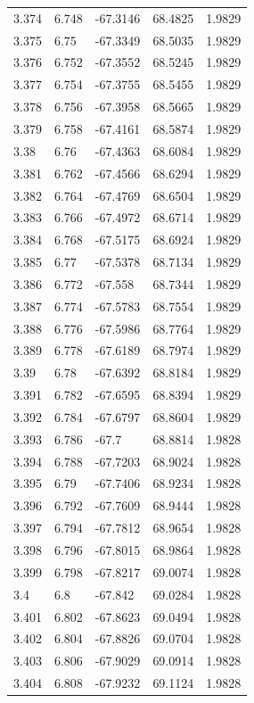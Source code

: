 \begin{tabular}{lllll}
3.374 & 6.748 & -67.3146 & 68.4825 & 1.9829 \\
3.375 & 6.75 & -67.3349 & 68.5035 & 1.9829 \\
3.376 & 6.752 & -67.3552 & 68.5245 & 1.9829 \\
3.377 & 6.754 & -67.3755 & 68.5455 & 1.9829 \\
3.378 & 6.756 & -67.3958 & 68.5665 & 1.9829 \\
3.379 & 6.758 & -67.4161 & 68.5874 & 1.9829 \\
3.38 & 6.76 & -67.4363 & 68.6084 & 1.9829 \\
3.381 & 6.762 & -67.4566 & 68.6294 & 1.9829 \\
3.382 & 6.764 & -67.4769 & 68.6504 & 1.9829 \\
3.383 & 6.766 & -67.4972 & 68.6714 & 1.9829 \\
3.384 & 6.768 & -67.5175 & 68.6924 & 1.9829 \\
3.385 & 6.77 & -67.5378 & 68.7134 & 1.9829 \\
3.386 & 6.772 & -67.558 & 68.7344 & 1.9829 \\
3.387 & 6.774 & -67.5783 & 68.7554 & 1.9829 \\
3.388 & 6.776 & -67.5986 & 68.7764 & 1.9829 \\
3.389 & 6.778 & -67.6189 & 68.7974 & 1.9829 \\
3.39 & 6.78 & -67.6392 & 68.8184 & 1.9829 \\
3.391 & 6.782 & -67.6595 & 68.8394 & 1.9829 \\
3.392 & 6.784 & -67.6797 & 68.8604 & 1.9829 \\
3.393 & 6.786 & -67.7 & 68.8814 & 1.9828 \\
3.394 & 6.788 & -67.7203 & 68.9024 & 1.9828 \\
3.395 & 6.79 & -67.7406 & 68.9234 & 1.9828 \\
3.396 & 6.792 & -67.7609 & 68.9444 & 1.9828 \\
3.397 & 6.794 & -67.7812 & 68.9654 & 1.9828 \\
3.398 & 6.796 & -67.8015 & 68.9864 & 1.9828 \\
3.399 & 6.798 & -67.8217 & 69.0074 & 1.9828 \\
3.4 & 6.8 & -67.842 & 69.0284 & 1.9828 \\
3.401 & 6.802 & -67.8623 & 69.0494 & 1.9828 \\
3.402 & 6.804 & -67.8826 & 69.0704 & 1.9828 \\
3.403 & 6.806 & -67.9029 & 69.0914 & 1.9828 \\
3.404 & 6.808 & -67.9232 & 69.1124 & 1.9828 \\

\end{tabular}
